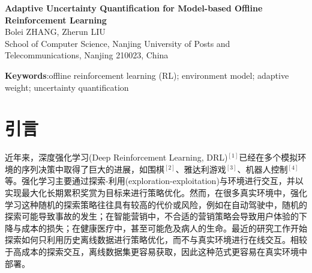 \documentclass{article}
\begin{document}
\begin{center}
  \small \textbf{Adaptive Uncertainty Quantification for Model-based Offline Reinforcement Learning} \\
  \vspace{0.3em}
  \small Bolei ZHANG, Zherun LIU \\
  \vspace{0.3em}
  \small School of Computer Science, Nanjing University of Posts and Telecommunications, Nanjing 210023, China
\end{center}
\begin{abstract}
  Offline reinforcement learning (RL) can directly learn executable policies from historical experience data, thus avoiding costly interactions with the online environment, and can be applied to various real scenarios such as robot manipulation, autonomous driving, intelligent recommendation, etc. Model-based offline RL first constructs an environmental model through supervised learning, then interacts with this model to optimize the policy. It has high sample efficiency and is widely considered a promising approach in related studies. However, the offline dataset has a distributional shift problem, which can lead to out-of-distribution uncertainty. Current methods mainly use static metrics to measure the environment model uncertainty and cannot adapt to the dynamic policy optimization process. Targeting the above problem, we propose a novel adaptive uncertainty quantification method. This method first estimates the uncertainty of each state, then uses a dynamic adaptive method to measure the uncertainty of the environment model. Thus a better trade-off between radicalism and conservatism can be achieved for the agent. Evaluations on multiple offline benchmarks demonstrate the usefulness and effectiveness of the proposed measurements.
\end{abstract}
\noindent \textbf{Keywords}:offline reinforcement learning (RL); environment model; adaptive weight; uncertainty quantification

\section{引言}
近年来，深度强化学习(Deep Reinforcement Learning, DRL)$^{[1]}$已经在多个模拟环境的序列决策中取得了巨大的进展，如围棋$^{[2]}$、雅达利游戏$^{[3]}$、机器人控制$^{[4]}$等。强化学习主要通过探索-利用(exploration-exploitation)与环境进行交互，并以实现最大化长期累积奖赏为目标来进行策略优化。然而，在很多真实环境中，强化学习这种随机的探索策略往往具有较高的代价或风险，例如在自动驾驶中，随机的探索可能导致事故的发生；在智能营销中，不合适的营销策略会导致用户体验的下降与成本的损失；在健康医疗中，甚至可能危及病人的生命。最近的研究工作开始探索如何只利用历史离线数据进行策略优化，而不与真实环境进行在线交互。相较于高成本的探索交互，离线数据集更容易获取，因此这种范式更容易在真实环境中部署。
\end{document}
